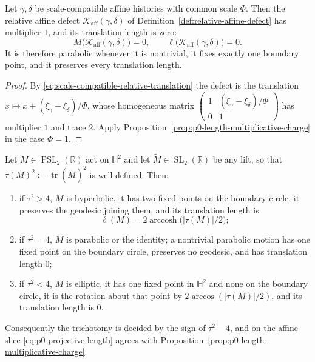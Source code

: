 \begin{proposition}
\label{prop:p0-relative-defect-length-zero}
Let $\gamma,\delta$ be scale-compatible affine histories with common scale $\Phi$.
Then the relative affine defect $\mathcal K_{\mathrm{aff}}(\gamma,\delta)$ of
Definition~\ref{def:relative-affine-defect} has multiplier $1$, and its translation
length is zero:
\begin{equation}\label{eq:p0-relative-defect-length-zero}
  M\bigl(\mathcal K_{\mathrm{aff}}(\gamma,\delta)\bigr)=0,
  \qquad
  \ell\bigl(\mathcal K_{\mathrm{aff}}(\gamma,\delta)\bigr)=0 .
\end{equation}
It is therefore parabolic whenever it is nontrivial, it fixes exactly one boundary
point, and it preserves every translation length.
\end{proposition}

\begin{proof}
By \eqref{eq:scale-compatible-relative-translation} the defect is the translation
$x\mapsto x+(\xi_\gamma-\xi_\delta)/\Phi$, whose homogeneous matrix
$\left(\begin{smallmatrix}1&(\xi_\gamma-\xi_\delta)/\Phi\\0&1\end{smallmatrix}\right)$
has multiplier $1$ and trace $2$.  Apply
Proposition~\ref{prop:p0-length-multiplicative-charge} in the case $\Phi=1$.
\end{proof}

\begin{proposition}
\label{prop:p0-projective-trichotomy}
Let $M\in\operatorname{PSL}_2(\mathbb R)$ act on $\mathbb H^2$ and let
$\widetilde M\in\operatorname{SL}_2(\mathbb R)$ be any lift, so that
$\tau(M)^2:=\operatorname{tr}(\widetilde M)^2$ is well defined.  Then:
\begin{enumerate}
\item if $\tau^2>4$, $M$ is hyperbolic, it has two fixed points on the boundary
  circle, it preserves the geodesic joining them, and its translation length is
  \begin{equation}\label{eq:p0-projective-length}
    \ell(M)=2\operatorname{arccosh}\bigl(\lvert\tau(M)\rvert/2\bigr);
  \end{equation}
\item if $\tau^2=4$, $M$ is parabolic or the identity; a nontrivial parabolic motion
  has one fixed point on the boundary circle, preserves no geodesic, and has
  translation length $0$;
\item if $\tau^2<4$, $M$ is elliptic, it has one fixed point in $\mathbb H^2$ and
  none on the boundary circle, it is the rotation about that point by
  $2\arccos(\lvert\tau(M)\rvert/2)$, and its translation length is $0$.
\end{enumerate}
Consequently the trichotomy is decided by the sign of $\tau^2-4$, and on the affine
slice \eqref{eq:p0-projective-length} agrees with
Proposition~\ref{prop:p0-length-multiplicative-charge}.
\end{proposition}

